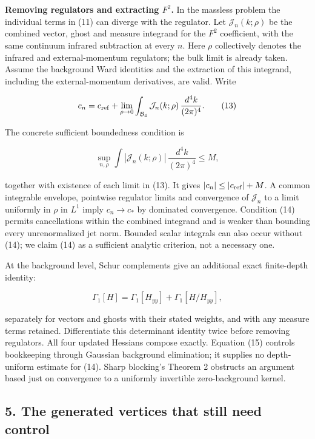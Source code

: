 \documentclass[11pt,a4paper]{article}
\begin{document}
\textbf{Removing regulators and extracting \(F^2\).} In the massless
problem the individual terms in (11) can diverge with the regulator. Let
\(\mathcal J_n(k;\rho)\) be the combined vector, ghost and measure
integrand for the \(F^2\) coefficient, with the same continuum infrared
subtraction at every \(n\). Here \(\rho\) collectively denotes the
infrared and external-momentum regulators; the bulk limit is already
taken. Assume the background Ward identities and the extraction of this
integrand, including the external-momentum derivatives, are valid. Write

\[c_n=c_{\rm ref}+\lim_{\rho\to0}
       \int_{\mathcal B_4}\mathcal J_n(k;\rho)\,
                         \frac{d^4k}{(2\pi)^4}. \tag{13}\]

The concrete sufficient boundedness condition is

\[\sup_{n,\rho}\int|\mathcal J_n(k;\rho)|\,
             \frac{d^4k}{(2\pi)^4}\le M, \tag{14}\]

together with existence of each limit in (13). It gives
\(|c_n|\le |c_{\rm ref}|+M\). A common integrable envelope, pointwise
regulator limits and convergence of \(\mathcal J_n\) to a limit
uniformly in \(\rho\) in \(L^1\) imply \(c_n\to c_*\) by dominated
convergence. Condition (14) permits cancellations within the combined
integrand and is weaker than bounding every unrenormalized jet norm.
Bounded scalar integrals can also occur without (14); we claim (14) as a
sufficient analytic criterion, not a necessary one.

At the background level, Schur complements give an additional exact
finite-depth identity:

\[\Gamma_1[H]=\Gamma_1[H_{yy}]
                    +\Gamma_1[H/H_{yy}], \tag{15}\]

separately for vectors and ghosts with their stated weights, and with
any measure terms retained. Differentiate this determinant identity
twice before removing regulators. All four updated Hessians compose
exactly. Equation (15) controls bookkeeping through Gaussian background
elimination; it supplies no depth-uniform estimate for (14). Sharp
blocking's Theorem 2 obstructs an argument based just on convergence to
a uniformly invertible zero-background kernel.

\hypertarget{the-generated-vertices-that-still-need-control}{%
\subsection{5. The generated vertices that still need
control}\label{the-generated-vertices-that-still-need-control}}
\end{document}

